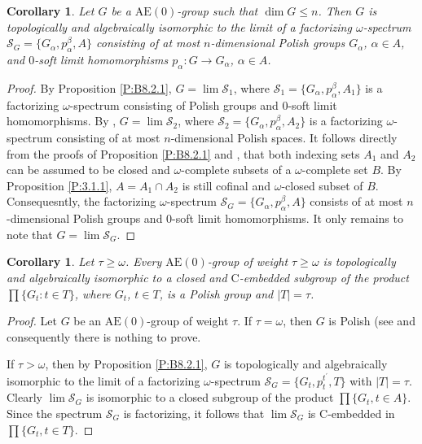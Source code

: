 \documentclass[12pt,draft]{amsart}
\theoremstyle{plain}
\newtheorem{cor}[thm]{Corollary}
\theoremstyle{definition}
\numberwithin{equation}{section}
\begin{document}
\begin{cor}\label{C:dim}
Let $G$ be a $\text{AE}(0)$-group such that $\dim G \leq n$. Then
$G$ is topologically
and algebraically isomorphic to the limit of a factorizing
$\omega$-spectrum ${\mathcal S}_{G} = \{ G_{\alpha},
p_{\alpha}^{\beta}, A\}$
consisting of at most $n$-dimensional Polish groups $G_{\alpha}$,
$\alpha \in A$, and $0$-soft
limit homomorphisms $p_{\alpha} \colon G \to G_{\alpha}$, $\alpha \in A$.
\end{cor}
\begin{proof}
By Proposition \ref{P:B8.2.1}, $G = \lim {\mathcal S}_{1}$,
where ${\mathcal S}_{1} = \{ G_{\alpha}, p_{\alpha}^{\beta}, A_{1}\}$
is a factorizing $\omega$-spectrum consisting of Polish groups
and $0$-soft limit homomorphisms. By \cite[Theorem 1.3.10]{chibook96},
$G = \lim {\mathcal S}_{2}$, where
${\mathcal S}_{2} = \{ G_{\alpha}, p_{\alpha}^{\beta}, A_{2}\}$
is a factorizing $\omega$-spectrum consisting of at most
$n$-dimensional Polish spaces. It follows directly from the
proofs of Proposition \ref{P:B8.2.1} and
\cite[Theorem 1.3.10]{chibook96}, that both indexing sets
$A_{1}$ and $A_{2}$ can be assumed to be closed and
$\omega$-complete subsets of a $\omega$-complete set $B$.
By Proposition
\ref{P:3.1.1}, $A = A_{1} \cap A_{2}$ is still cofinal and
$\omega$-closed subset of $B$.
Consequesntly, the factorizing $\omega$-spectrum
${\mathcal S}_{G} = \{ G_{\alpha}, p_{\alpha}^{\beta}, A\}$
consists of at most $n$-dimensional Polish groups and $0$-soft
limit homomorphisms. It only remains to note that
$G = \lim{\mathcal S}_{G}$.
\end{proof}


\begin{cor}\label{C:emb}
Let $\tau \geq \omega$. Every $\text{AE}(0)$-group of
weight $\tau \geq \omega$
is topologically and algebraically isomorphic to a closed
and $\text{C}$-embedded
subgroup of the product
$\displaystyle \prod\{ G_{t} \colon t \in T\}$, where $G_{t}$,
$t \in T$, is a Polish group and $|T| = \tau$.
\end{cor}
\begin{proof}
Let $G$ be an $\text{AE}(0)$-group of weight $\tau$.
If $\tau = \omega$, then
$G$ is Polish (see \cite[Chapter 6]{chibook96} and consequently
there is nothing to prove.

If $\tau > \omega$, then by Proposition \ref{P:B8.2.1}, $G$ is
topologically and algebraically 
isomorphic to the limit of a factorizing $\omega$-spectrum
${\mathcal S}_{G} = \{ G_{t}, p_{t}^{t^{\prime}}, T\}$
with $|T|  = \tau$. 
Clearly $\lim {\mathcal S}_{G}$ is isomorphic to a closed subgroup
of the product
$\displaystyle \prod\{ G_{t}, t \in A\}$. Since the spectrum
${\mathcal S}_{G}$ is factorizing,
it follows that $\lim {\mathcal S}_{G}$ is $\text{C}$-embedded
in $\displaystyle \prod\{ G_{t}, t \in T\}$.
\end{proof}
\end{document}
